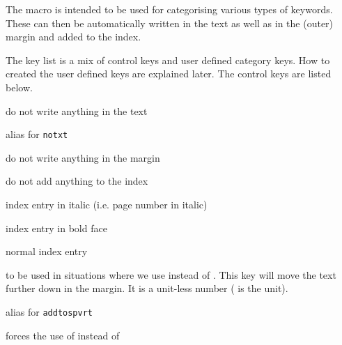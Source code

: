 \documentclass[11pt,oneside,a4paper,oldfontcommands,danish,english,article]{memoir}
\begin{document}
The  macro is intended to be used for
categorising various types of keywords. These can then be
automatically written in the text as well as in the (outer) margin and 
added to the index.
\begin{syntax}
\end{syntax}
The key list is a mix of control keys and user defined category
keys. How to created the user defined keys are explained later.
The control keys are listed below.
\begingroup
\renewcommand\descriptionlabel[1]{%
  \hspace\labelsep%
  \settowidth\unitlength{\texttt{#1}}%
  \addtolength\unitlength{\labelsep}%
  \ifdim\unitlength>\leftmargin%
    \parbox[t]{\textwidth}{\normalsize\texttt{#1}}%
  \else%
    \parbox[t]{\leftmargin-\labelsep}{\normalsize\texttt{#1}}%
  \fi%
}
\begin{description}\firmlist\firmlist
\small
\item[notxt] do not write anything in the text

\item[nowr] alias for \texttt{notxt}
\item[nomk] do not write anything in the margin
\item[noidx] do not add anything to the index
\item[idxit] index entry in italic (i.e. page number in italic)
\item[idxbf] index entry in bold face
\item[idxn] normal index entry

\item[addtospvrt=\Arg{number}] to be used in situations where we use
   instead of . This key
  will move the text further down in the margin. It is a unit-less
  number ( is the unit).


\item[vaddtosp=\Arg{number}] alias for \texttt{addtospvrt}

 \item[forcesidepar] forces the use of  instead
   of 

\end{description}
\end{document}
